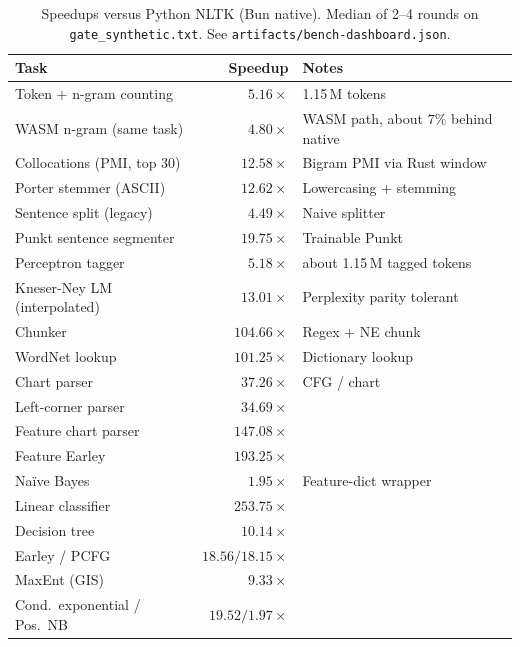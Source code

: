 \documentclass[smallextended]{svjour3}
\begin{document}
\begin{table}[t]
\centering
\caption{Speedups versus Python NLTK (Bun native). Median of 2--4 rounds on \texttt{gate\_synthetic.txt}. See \texttt{artifacts/bench-dashboard.json}.}
\label{tab:speedup}
\begin{tabular}{@{}l r l@{}}
\toprule
Task & Speedup & Notes \\
\midrule
Token + n-gram counting      & $5.16\times$   & 1.15\,M tokens \\
WASM n-gram (same task)     & $4.80\times$   & WASM path, about $7\%$ behind native \\
Collocations (PMI, top 30)  & $12.58\times$  & Bigram PMI via Rust window \\
Porter stemmer (ASCII)      & $12.62\times$  & Lowercasing + stemming \\
Sentence split (legacy)     & $4.49\times$   & Naive splitter \\
Punkt sentence segmenter    & $19.75\times$  & Trainable Punkt \\
Perceptron tagger           & $5.18\times$   & about 1.15\,M tagged tokens \\
Kneser-Ney LM (interpolated)& $13.01\times$  & Perplexity parity tolerant \\
Chunker                    & $104.66\times$ & Regex + NE chunk \\
WordNet lookup             & $101.25\times$ & Dictionary lookup \\
Chart parser               & $37.26\times$  & CFG / chart \\
Left-corner parser         & $34.69\times$  &  \\
Feature chart parser       & $147.08\times$ &  \\
Feature Earley             & $193.25\times$ &  \\
Na\"ive Bayes              & $1.95\times$   & Feature-dict wrapper \\
Linear classifier          & $253.75\times$ &  \\
Decision tree              & $10.14\times$  &  \\
Earley / PCFG              & $18.56 / 18.15\times$ &  \\
MaxEnt (GIS)               & $9.33\times$   &  \\
Cond.\ exponential / Pos.\ NB & $19.52 / 1.97\times$ &  \\
\bottomrule
\end{tabular}
\end{table}
\end{document}
